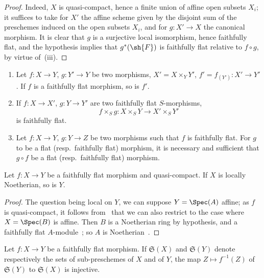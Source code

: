 \begin{proof}
Indeed, $X$ is quasi-compact, hence a finite union of affine open subsets $X_i$; it suffices to take for $X'$ the affine scheme given by the disjoint sum of the preschemes induced on the open subsets $X_i$, and for $g:X'\to X$ the canonical morphism.
It is clear that $g$ is a surjective local isomorphism, hence faithfully flat, and the hypothesis implies that $g^*(\sh{F})$ is faithfully flat relative to $f\circ g$, by virtue of~\textnormal{(iii)}.
\end{proof}

\begin{corollary}[2.2.13]
\label{IV.2.2.13}
\medskip\noindent
\begin{enumerate}
  \item[\textnormal{(i)}] Let $f:X\to Y$, $g:Y'\to Y$ be two morphisms, $X'=X\times_Y Y'$, $f'=f_{(Y')}:X'\to Y'$.
    If $f$ is a faithfully flat morphism, so is $f'$.
  \item[\textnormal{(ii)}] If $f:X\to X'$, $g:Y\to Y'$ are two faithfully flat $S$-morphisms,
    \[
      f\times_S g: X\times_S Y \to X'\times_S Y'
    \]
    is faithfully flat.
  \item[\textnormal{(iii)}] Let $f:X\to Y$, $g:Y\to Z$ be two morphisms such that $f$ is faithfully flat.
    For $g$ to be a flat \textnormal{(}resp.\ faithfully flat\textnormal{)} morphism, it is necessary and sufficient that $g\circ f$ be a flat \textnormal{(}resp.\ faithfully flat\textnormal{)} morphism.
\end{enumerate}
\end{corollary}

\begin{proposition}[2.2.14]
\label{IV.2.2.14}
Let $f:X\to Y$ be a faithfully flat morphism and quasi-compact.
If $X$ is locally Noetherian, so is $Y$.
\end{proposition}

\begin{proof}
The question being local on $Y$, we can suppose $Y=\Spec(A)$ affine; as $f$ is quasi-compact, it follows from~ that we can also restrict to the case where $X=\Spec(B)$ is affine.
Then $B$ is a Noetherian ring by hypothesis, and a faithfully flat $A$-module~; so $A$ is Noetherian~.
\end{proof}

\begin{proposition}[2.2.15]
\label{IV.2.2.15}
Let $f:X\to Y$ be a faithfully flat morphism.
If $\mathfrak{S}(X)$ and $\mathfrak{S}(Y)$ denote respectively the sets of sub-preschemes of $X$ and of $Y$, the map $Z\mapsto f^{-1}(Z)$ of $\mathfrak{S}(Y)$ to $\mathfrak{S}(X)$ is injective.
\end{proposition}

